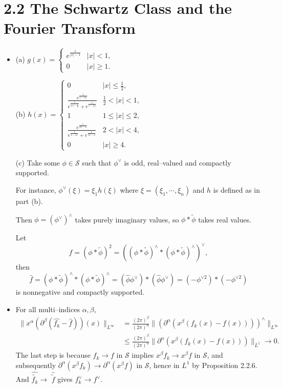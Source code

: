 \section*{2.2 The Schwartz Class and the Fourier Transform}
\begin{itemize}
\item[2.2.1]

(a)
$g(x)=\left\{
\begin{matrix}
e^{\frac{1}{|x|-1}} & |x|<1,\\
0 & |x|\geq1.
\end{matrix}
\right.$

(b)
$h(x)=\left\{
\begin{matrix}
0 & |x|\leq\frac{1}{2},\\
\frac{e^{\frac{1}{1-|x|}}}
{e^{\frac{1}{|x|-\frac{1}{2}}}+e^{\frac{1}{1-|x|}}} & \frac{1}{2}<|x|<1,\\
1 & 1\leq|x|\leq2,\\
\frac{e^{\frac{1}{|x|-2}}}
{e^{\frac{1}{4-|x|}}+e^{\frac{1}{|x|-2}}} & 2<|x|<4,\\
0 & |x|\geq4.
\end{matrix}
\right.$

(c) Take some $\phi\in\mathscr{S}$ such that $\phi^\vee$ is 
odd, real--valued and compactly supported.

For instance, $\phi^\vee(\xi)=\xi_1h(\xi)$ where $\xi=(\xi_1,\cdots,\xi_n)$ 
and $h$ is defined as in part (b).

Then $\phi=(\phi^\vee)^\wedge$ takes purely imaginary values, 
so $\phi*\widetilde{\phi}$ takes real values.

Let
$$f=(\phi*\widetilde{\phi})^2=((\phi*\widetilde{\phi})^\wedge*(\phi*\widetilde{\phi})^\wedge)^\vee,$$
then
$$\hat{f}=(\phi*\widetilde\phi)^\wedge*(\phi*\widetilde{\phi})^\wedge=(\hat{\phi}\phi^\vee)*(\hat{\phi}\phi^\vee)=(-\phi^{\vee2})*(-\phi^{\vee2})$$
is nonnegative and compactly supported.

\item[2.2.2]

For all multi--indices $\alpha,\beta$,
\begin{align*}
\|x^\alpha(\partial^\beta(\hat{f_k}-\hat{f}))(x)\|_{L^\infty}&
=\frac{(2\pi)^\beta}{(2\pi)^\alpha}\|(\partial^\alpha(x^\beta (f_k(x)-f(x))))^\wedge\|_{L^\infty}\\
&\leq\frac{(2\pi)^\beta}{(2\pi)^\alpha}\|\partial^\alpha(x^\beta (f_k(x)-f(x)))\|_{L^1}\rightarrow0.
\end{align*}
The last step is because $f_k\rightarrow f$ in $\mathscr{S}$ implies 
$x^\beta f_k\rightarrow x^\beta f$ in $\mathscr{S}$, 
and subsequently $\partial^\alpha(x^\beta f_k)\rightarrow \partial^\alpha(x^\beta f)$ in $\mathscr{S}$, hence in $L^1$ by Proposition 2.2.6. 
And $\hat{\tilde{f_k}}\rightarrow \,\,\hat{\!\!\tilde{f}}$ 
gives $f_k^\vee\rightarrow f^\vee$.


\end{itemize}
